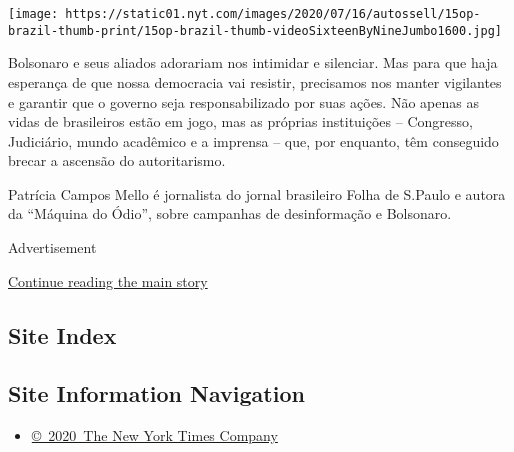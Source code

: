 \texttt{[image: https://static01.nyt.com/images/2020/07/16/autossell/15op-brazil-thumb-print/15op-brazil-thumb-videoSixteenByNineJumbo1600.jpg]}

Bolsonaro e seus aliados adorariam nos intimidar e silenciar. Mas para
que haja esperança de que nossa democracia vai resistir, precisamos nos
manter vigilantes e garantir que o governo seja responsabilizado por
suas ações. Não apenas as vidas de brasileiros estão em jogo, mas as
próprias instituições -- Congresso, Judiciário, mundo acadêmico e a
imprensa -- que, por enquanto, têm conseguido brecar a ascensão do
autoritarismo.

Patrícia Campos Mello é jornalista do jornal brasileiro Folha de S.Paulo
e autora da ``Máquina do Ódio'', sobre campanhas de desinformação e
Bolsonaro.

Advertisement

\protect\hyperlink{after-bottom}{Continue reading the main story}

\hypertarget{site-index}{%
\subsection{Site Index}\label{site-index}}

\hypertarget{site-information-navigation}{%
\subsection{Site Information
Navigation}\label{site-information-navigation}}

\begin{itemize}
\tightlist
\item
  \href{https://help.nytimes.com/hc/en-us/articles/115014792127-Copyright-notice}{©~2020~The
  New York Times Company}
\end{itemize}

